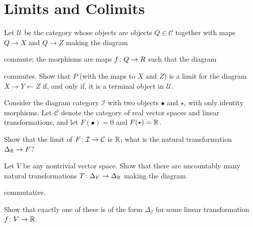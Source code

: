 \bs
\ben[label=(\alph*)]
\item 
\item 
\item 
\een
\es

\section{Limits and Colimits}

\bx
Let $\mathcal{U}$ be the category whose objects are objects $Q \in \mathcal{C}$ together with maps $Q \to X$ and $Q \to Z$ making the diagram 
\bse
{}
\ese
commute; the morphisms are maps $f \colon Q \to R$ such that the diagram
\bse
{}
\ese
commutes. Show that $P$ (with the maps to $X$ and $Z$) is a limit for the diagram $X \to Y \leftarrow Z$ if, and only if, it is a terminal object in $\mathcal{U}$.
\ex

\bs
\es

\bx
Consider the diagram category $\mathcal{I}$ with two objects $\bullet$ and $\star$, with only identity morphisms. Let $\mathcal{C}$ denote the category of real vector spaces and linear transformations, and let $F(\bullet) = 0$ and $F(\star) = \mathbb{R}$.
\ben[label=(\alph*)]
\item Show that the limit of $F \colon\mathcal{I} \to \mathcal{C}$ is $\mathbb{R}$; what is the natural transformation $\Delta_{\mathbb{R}} \to F$?
\item Let $V$ be any nontrivial vector space. Show that there are uncountably many natural transformations $T \colon \Delta_V \to \Delta_{\mathbb{R}}$ making the diagram
\bse
{}
\ese
commutative.
\item Show that exactly one of these is of the form $\Delta_f$ for some linear transformation $f \colon V \to \mathbb{R}$.
\een
\ex

